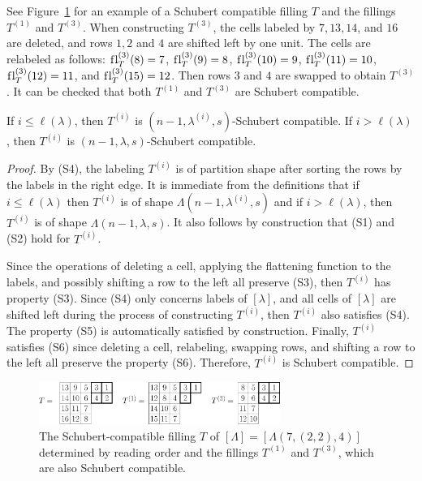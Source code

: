 \documentclass[12pt]{amsart}
\newcommand{\la}{\lambda}
\newcommand{\fl}{\mathrm{f\hspace{0.25pt}l}}
\begin{document}
See Figure~\ref{fig:ReadingOrder} for an example of a Schubert compatible filling $T$ and the fillings $T^{(1)}$ and $T^{(3)}$. When constructing $T^{(3)}$, the cells labeled by $7,13,14$, and $16$ are deleted, and rows $1,2$ and $4$ are shifted left by one unit. The cells are relabeled as follows: $\fl_T^{(3)}(8)=7$, $\fl_T^{(3)}(9) = 8$, $\fl_T^{(3)}(10) = 9$, $\fl_T^{(3)}(11)=10$, $\fl_T^{(3)}(12) = 11$, and $\fl_T^{(3)}(15)=12$. Then rows $3$ and $4$ are swapped to obtain $T^{(3)}$. It can be checked that both $T^{(1)}$ and $T^{(3)}$ are  Schubert compatible.

\begin{lemma}
If $i \leq \ell(\lambda)$, then $T^{(i)}$ is $(n-1,\lambda^{(i)},s)$-Schubert compatible. If $i > \ell(\lambda)$, then $T^{(i)}$ is $(n-1,\lambda,s)$-Schubert compatible.
\end{lemma}

\begin{proof}
By (S4), the labeling $T^{(i)}$ is of partition shape after sorting the rows by the labels in the right edge. It is immediate from the definitions that if $i\leq \ell(\la)$ then $T^{(i)}$ is of shape $\Lambda(n-1,\la^{(i)},s)$ and if $i> \ell(\la)$, then $T^{(i)}$ is of shape $\Lambda(n-1,\la,s)$. It also follows by construction that (S1) and (S2) hold for $T^{(i)}$.

Since the operations of deleting a cell, applying the flattening function to the labels, and possibly shifting a row to the left all preserve (S3), then $T^{(i)}$ has property (S3). Since (S4) only concerns labels of $[\lambda]$, and all cells of $[\lambda]$ are shifted left during the process of constructing $T^{(i)}$, then $T^{(i)}$ also satisfies (S4). The property (S5) is automatically satisfied by construction. Finally, $T^{(i)}$ satisfies (S6) since deleting a cell, relabeling, swapping rows, and shifting a row to the left all preserve the property (S6). Therefore, $T^{(i)}$ is Schubert compatible. 
\end{proof}




\begin{figure}
    \centering
    \includegraphics[width=0.7\textwidth]{ReadingOrder.eps}
    \caption{The Schubert-compatible filling $T$ of $[\Lambda] = [\Lambda(7,(2,2),4)]$ determined by reading order and the fillings $T^{(1)}$ and $T^{(3)}$, which are also Schubert compatible.}
    \label{fig:ReadingOrder}
\end{figure}
\end{document}
